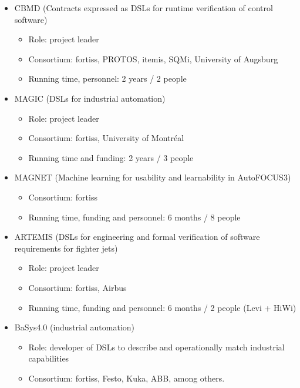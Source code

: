 \documentclass{scrartcl}
\begin{document}
\begin{appendices}
\begin{itemize}
  \item CBMD (Contracts expressed as DSLs for runtime verification of control
  software)
  \begin{itemize}
    \item Role: project leader
    \item Consortium: fortiss, PROTOS, itemis, SQMi, University of Augsburg
    \item Running time, personnel: 2 years / 2 people
  \end{itemize} 
  \item MAGIC (DSLs for industrial automation)
  \begin{itemize}
    \item Role: project leader
    \item Consortium: fortiss, University of Montréal
    \item Running time and funding: 2 years / 3 people
  \end{itemize} 
  \item MAGNET (Machine learning for usability and learnability in AutoFOCUS3)
  \begin{itemize}
    \item Consortium: fortiss
    \item Running time, funding and personnel: 6 months / 8 people
  \end{itemize}
  \item ARTEMIS (DSLs for engineering and formal verification of software
  requirements for fighter jets)
  \begin{itemize}
    \item Role: project leader
    \item Consortium: fortiss, Airbus
    \item Running time, funding and personnel: 6 months / 2 people
    (Levi + HiWi)
  \end{itemize} 
  \item BaSys4.0 (industrial automation)
  \begin{itemize}
    \item Role: developer of DSLs to describe and operationally match industrial
    capabilities
    \item Consortium: fortiss, Festo, Kuka, ABB, among others.
  \end{itemize}   
\end{itemize}
 
\end{appendices}
\newpage


\end{document}
